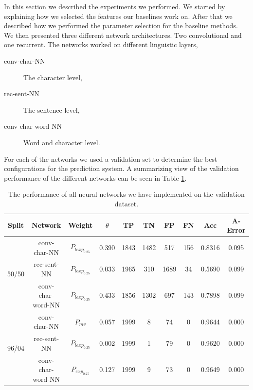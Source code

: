 In this section we described the experiments we performed. We started by
explaining how we selected the features our baselines work on. After that we
described how we performed the parameter selection for the baseline methods. We
then presented three different network architectures. Two convolutional and one
recurrent. The networks worked on different linguistic layers,

\begin{description}
    \item[\gls{conv-char-NN}] The character level,
    \item[\gls{rec-sent-NN}] The sentence level,
    \item[\gls{conv-char-word-NN}] Word and character level.
\end{description}

For each of the networks we used a validation set to determine the best
configurations for the prediction system. A summarizing view of the
validation performance of the different networks can be seen in Table
\ref{tab:experi-results}.

\begin{table}[h]
\begin{tabular}{|c|c|c|c|c|c|c|c|c|c|}
\hline
Split                  & Network                 & Weight            & $\theta$ & TP  & TN  & FP  & FN & Acc     & A-Error \\ \hline
\multirow{3}{*}{50/50} & \gls{conv-char-NN}      & $P_{lexp_{0.25}}$ & 0.390    & 1843 & 1482 & 517  & 156 & 0.8316 & 0.095   \\ \cline{2-10} 
                       & \gls{rec-sent-NN}       & $P_{lexp_{0.25}}$ & 0.033    & 1965 & 310  & 1689 & 34  & 0.5690 & 0.099   \\ \cline{2-10} 
                       & \gls{conv-char-word-NN} & $P_{lexp_{0.25}}$ & 0.433    & 1856 & 1302 & 697  & 143 & 0.7898 & 0.099   \\ \hline
\multirow{3}{*}{96/04} & \gls{conv-char-NN}      & $P_{mv}$          & 0.057    & 1999 & 8    & 74   & 0   & 0.9644 & 0.000   \\ \cline{2-10} 
                       & \gls{rec-sent-NN}       & $P_{lexp_{0.25}}$ & 0.002    & 1999 & 1    & 79   & 0   & 0.9620 & 0.000   \\ \cline{2-10} 
                       & \gls{conv-char-word-NN} & $P_{exp_{0.25}}$  & 0.127    & 1999 & 9    & 73   & 0   & 0.9649 & 0.000   \\ \hline
\end{tabular}
\caption{The performance of all neural networks we have implemented on the
    validation dataset.}
\label{tab:experi-results}
\end{table}
